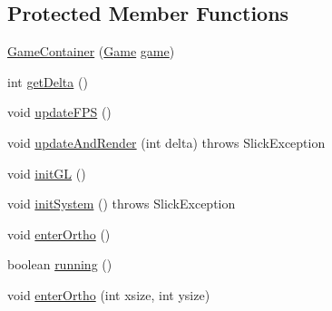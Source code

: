 \subsection*{Protected Member Functions}
\begin{DoxyCompactItemize}
\item 
\mbox{\hyperlink{classorg_1_1newdawn_1_1slick_1_1_game_container_add5e3083ba4b2604c99fe30c3a022cfb}{Game\+Container}} (\mbox{\hyperlink{interfaceorg_1_1newdawn_1_1slick_1_1_game}{Game}} \mbox{\hyperlink{classorg_1_1newdawn_1_1slick_1_1_game_container_a6a38bb26e45e1c884940caf35c7cfcdc}{game}})
\item 
int \mbox{\hyperlink{classorg_1_1newdawn_1_1slick_1_1_game_container_a47af7100d91a7101cb71574dc70fb0dc}{get\+Delta}} ()
\item 
void \mbox{\hyperlink{classorg_1_1newdawn_1_1slick_1_1_game_container_a3894fc3250d4731e4218bc69bfc281df}{update\+F\+PS}} ()
\item 
void \mbox{\hyperlink{classorg_1_1newdawn_1_1slick_1_1_game_container_a91b4f51ca42ad0b9dcca0e9fc2118f9f}{update\+And\+Render}} (int delta)  throws Slick\+Exception 
\item 
void \mbox{\hyperlink{classorg_1_1newdawn_1_1slick_1_1_game_container_a8cef7158ee723477c3435e791b21df66}{init\+GL}} ()
\item 
void \mbox{\hyperlink{classorg_1_1newdawn_1_1slick_1_1_game_container_a6fee625fa386e0ef5a99b6f4bcc3f147}{init\+System}} ()  throws Slick\+Exception 
\item 
void \mbox{\hyperlink{classorg_1_1newdawn_1_1slick_1_1_game_container_a1e8c835b781b018347f50dcf37bbb5c2}{enter\+Ortho}} ()
\item 
boolean \mbox{\hyperlink{classorg_1_1newdawn_1_1slick_1_1_game_container_a5cb10a093281abb5b6ee60f2b18c26c3}{running}} ()
\item 
void \mbox{\hyperlink{classorg_1_1newdawn_1_1slick_1_1_game_container_aa8a6427283d666bb66f824a817ff9b0b}{enter\+Ortho}} (int xsize, int ysize)
\end{DoxyCompactItemize}
